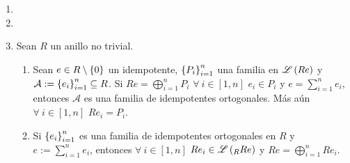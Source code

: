 \documentclass{article}
\begin{document}
\begin{enumerate}[label=\textbf{Ej \arabic*.}]
		\begin{proof}
			Se tiene el siguiente esquema
			\begin{center}
			\end{center}
			con $P$ proyectivo y $g$, en partícular por ser un epi-esencial, un epimorfismo en $Mod(R)$. Por lo tanto $\exists\ h\in\functhom{P}{Q}{R}$ tal que \begin{equation*}\tag{*}\label{factproy}
				gh=f.
			\end{equation*} Así pues, basta con verificar que $h$ es un isomorfismo en $Mod(R)$. De (\ref{factproy}) se sigue que, como $g$ es un epi-esencial y $f$ es en  partícular un epimorfismo en $Mod(R)$,  $h$ es un epimorfismo en $Mod(R)$. Con lo cual, si $i$ es la inclusión natural de $Ker\lrprth{h}$ en $P$, la sucesión
			\begin{center}
			\end{center}
			es exacta. Más aún es una sucesión exacta que se parte, puesto que $Q$ es proyectivo (Ej. 62), con lo cual $h$ es un split-epi (Ej. 54) i.e. $\exists$ $j\in\functhom{Q}{P}{R}$ tal que $hj=Id_Q$. Notemos que lo anterior garantiza que $j$ es un split-mono y así en partícular es un monomorfismo. Además
			\begin{align*}
				gh=f&\implies fj=g,
			\end{align*}
			con lo cual $j$ es un epimorfismo, pues $g$ lo es y $f$ es un epi-esencial. Así $j$ es un isomorfismo en $Mod(R)$ y por lo tanto $h=j^{-1}$ también lo es.\\
		\end{proof}
		\item 
		\item
		\item Sean $R$ un anillo no trivial.
		\begin{enumerate}
			\item Sean $e\in R\setminus\left\{0\right\}$ un idempotente, ${\left\{{P}_{i}\right\}}_{i=1}^{n}$ una familia en $\mathscr{L}\left(Re\right)$ y $\mathcal{A}:={\left\{{e}_{i}\right\}}_{i=1}^{n}\subseteq R$. Si $Re=\bigoplus\limits_{i=1}^n P_i$ $\forall\ i\in[1,n]$ $e_i\in P_i$ y $e=\sum\limits_{i=1}^ne_i$, entonces $\mathcal{A}$ es una familia de idempotentes ortogonales. Más aún $\forall\ i\in[1,n]$ $Re_i=P_i$.
			\item Si ${\left\{{e}_{i}\right\}}_{i=1}^{n}$ es una familia de idempotentes ortogonales en $R$ y $e:=\sum\limits_{i=1}^ne_i$, entonces $\forall\ i\in[1,n]$ $Re_i\in\genlin{\ringmod{R}{Re}{l}}$ y $Re=\bigoplus\limits_{i=1}^n Re_i$.

\end{enumerate}
\end{enumerate}
\end{document}
